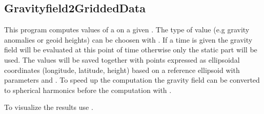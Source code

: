 \clearpage
\subsection{Gravityfield2GriddedData}\label{Gravityfield2GriddedData}
This program computes values of a  on a given .
The type of value (e.g gravity anomalies or geoid heights) can be choosen with .
If a time is given the gravity field will be evaluated at this point of time otherwise only the static part will be used.
The values will be saved together with points expressed as ellipsoidal coordinates (longitude, latitude, height)
based on a reference ellipsoid with parameters  and .
To speed up the computation the gravity field can be converted to spherical harmonics before the computation
with .

To visualize the results use .


